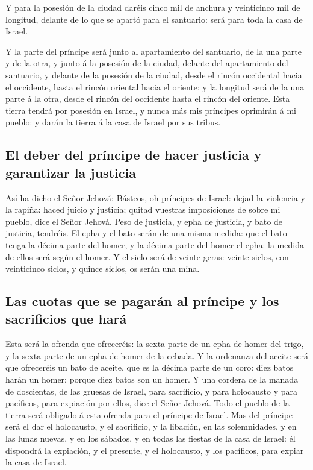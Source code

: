  Y para la posesión de la ciudad daréis cinco mil de anchura
y veinticinco mil de longitud, delante de lo que se apartó para el
santuario: será para toda la casa de Israel.

 Y la parte del príncipe será junto al apartamiento del
santuario, de la una parte y de la otra, y junto á la posesión de la
ciudad, delante del apartamiento del santuario, y delante de la posesión
de la ciudad, desde el rincón occidental hacia el occidente, hasta el
rincón oriental hacia el oriente: y la longitud será de la una parte á
la otra, desde el rincón del occidente hasta el rincón del oriente.
 Esta tierra tendrá por posesión en Israel, y nunca más mis
príncipes oprimirán á mi pueblo: y darán la tierra á la casa de Israel
por sus tribus.

\hypertarget{el-deber-del-pruxedncipe-de-hacer-justicia-y-garantizar-la-justicia}{%
\subsection{El deber del príncipe de hacer justicia y garantizar la
justicia}\label{el-deber-del-pruxedncipe-de-hacer-justicia-y-garantizar-la-justicia}}

 Así ha dicho el Señor Jehová: Básteos, oh príncipes de
Israel: dejad la violencia y la rapiña: haced juicio y justicia; quitad
vuestras imposiciones de sobre mi pueblo, dice el Señor Jehová.
 Peso de justicia, y epha de justicia, y bato de justicia,
tendréis.  El epha y el bato serán de una misma medida: que
el bato tenga la décima parte del homer, y la décima parte del homer el
epha: la medida de ellos será según el homer.  Y el siclo
será de veinte geras: veinte siclos, con veinticinco siclos, y quince
siclos, os serán una mina.

\hypertarget{las-cuotas-que-se-pagaruxe1n-al-pruxedncipe-y-los-sacrificios-que-haruxe1}{%
\subsection{Las cuotas que se pagarán al príncipe y los sacrificios que
hará}\label{las-cuotas-que-se-pagaruxe1n-al-pruxedncipe-y-los-sacrificios-que-haruxe1}}

 Esta será la ofrenda que ofreceréis: la sexta parte de un
epha de homer del trigo, y la sexta parte de un epha de homer de la
cebada.  Y la ordenanza del aceite será que ofreceréis un
bato de aceite, que es la décima parte de un coro: diez batos harán un
homer; porque diez batos son un homer.  Y una cordera de la
manada de doscientas, de las gruesas de Israel, para sacrificio, y para
holocausto y para pacíficos, para expiación por ellos, dice el Señor
Jehová.  Todo el pueblo de la tierra será obligado á esta
ofrenda para el príncipe de Israel.  Mas del príncipe será
el dar el holocausto, y el sacrificio, y la libación, en las
solemnidades, y en las lunas nuevas, y en los sábados, y en todas las
fiestas de la casa de Israel: él dispondrá la expiación, y el presente,
y el holocausto, y los pacíficos, para expiar la casa de Israel.

